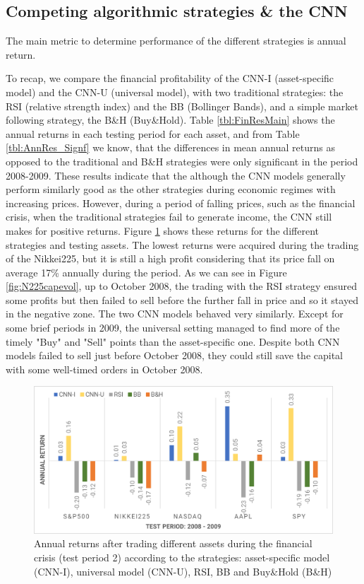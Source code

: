 \documentclass[11pt, a4paper]{article}
\begin{document}
\subsection{Competing algorithmic strategies \& the CNN}

The main metric to determine performance of the different strategies is annual return. 

To recap, we compare the financial profitability of the CNN-I (asset-specific model) and the CNN-U (universal model), with two traditional strategies: the RSI (relative strength index) and the BB (Bollinger Bands), and a simple market following strategy, the B\&H (Buy\&Hold). 
Table \ref{tbl:FinResMain} shows the annual returns in each testing period for each asset, and from Table \ref{tbl:AnnRes_Signf} we know, that the differences in mean annual returns as opposed to the traditional and B\&H strategies were only significant in the period 2008-2009. 
These results indicate that the although the CNN models generally perform similarly good as the other strategies during economic regimes with increasing prices. However, during a period of falling prices, such as the financial crisis, when the traditional strategies fail to generate income, the CNN still makes for positive returns. 
Figure \ref{fig:CNNvsComp_2} shows these returns for the different strategies and testing assets. The lowest returns were acquired during the trading of the Nikkei225, but it is still a high profit considering that its price fall on average 17\% annually during the period. As we can see in Figure \ref{fig:N225capevol}, up to October 2008, the trading with the RSI strategy ensured some profits but then failed to sell before the further fall in price and so it stayed in the negative zone. The two CNN models behaved very similarly. 
Except for some brief periods in 2009, the universal setting managed to find more of the timely "Buy" and "Sell" points than the asset-specific one. Despite both CNN models failed to sell just before October 2008, they could still save the capital with some well-timed orders in October 2008.
\begin{figure}[ht]
    \centering
    \includegraphics[width=.75\textwidth]{images/CNNvsComp_Crisis.png}
    \caption{Annual returns after trading different assets during the financial crisis (test period 2) according to the strategies: asset-specific model (CNN-I), universal model (CNN-U), RSI, BB and Buy\&Hold (B\&H)}
    \label{fig:CNNvsComp_2}
\end{figure}
\end{document}
